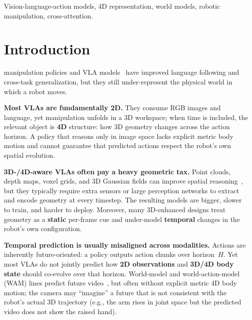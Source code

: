 \documentclass[journal]{IEEEtran}
\begin{document}
\begin{IEEEkeywords}
Vision-language-action models, 4D representation, world models, robotic
manipulation, cross-attention.
\end{IEEEkeywords}

\IEEEpeerreviewmaketitle

\section{Introduction}
\label{sec:intro}

 manipulation policies and VLA
models~\cite{rt1,rt2,chi2023diffusion,zhao2023act,kim2024openvla,black2024pi0}
have improved language following and cross-task generalization, but they
still under-represent the physical world in which a robot moves.

\textbf{Most VLAs are fundamentally 2D.} They consume RGB images and
language, yet manipulation unfolds in a 3D workspace; when time is
included, the relevant object is \textbf{4D} structure: how 3D geometry
changes across the action horizon. A policy that reasons only in image
space lacks explicit metric body motion and cannot guarantee that
predicted actions respect the robot's own spatial evolution.

\textbf{3D-/4D-aware VLAs often pay a heavy geometric tax.} Point clouds,
depth maps, voxel grids, and 3D Gaussian fields can improve spatial
reasoning~\cite{ze2024dp3,yang2025fp3,gervet2023act3d}, but they typically
require extra sensors or large perception networks to extract and encode
geometry at every timestep. The resulting models are bigger, slower to
train, and harder to deploy. Moreover, many 3D-enhanced designs treat
geometry as a \textbf{static} per-frame cue and under-model
\textbf{temporal} changes in the robot's own configuration.

\textbf{Temporal prediction is usually misaligned across modalities.}
Actions are inherently future-oriented: a policy outputs action chunks
over horizon~$H$. Yet most VLAs do not jointly predict how \textbf{2D
observations} and \textbf{3D/4D body state} should co-evolve over that
horizon. World-model and world-action-model (WAM) lines predict future
video~\cite{ha2018worldmodels,nvidia2026wam,lawam2026}, but often without
explicit metric 4D body motion; the camera may ``imagine'' a future that
is not consistent with the robot's actual 3D trajectory (e.g., the arm
rises in joint space but the predicted video does not show the raised
hand).
\end{document}
